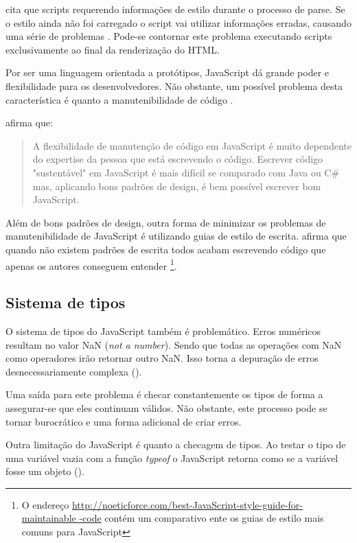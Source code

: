 \citet{howBrowsersWork} cita que scripts requerendo informações de
estilo durante o processo de parse. Se o estilo ainda não foi carregado
o script vai utilizar informações erradas, causando uma série de
problemas . Pode-se
contornar este problema executando scripts exclusivamente ao final da
renderização do HTML.

Por ser uma linguagem orientada a protótipos, JavaScript dá grande
poder e flexibilidade para os desenvolvedores. Não obstante, um
possível problema desta característica é quanto a manutenibilidade de
código .

\citet{html5Tradeoffs} afirma que:
\begin{quote}
A flexibilidade de manutenção de código em JavaScript é muito
dependente do expertise da pessoa que está escrevendo o código.
Escrever código "sustentável" em JavaScript é mais difícil se
comparado com Java ou C\# mas, aplicando bons padrões de design, é bem
possível escrever bom JavaScript.
\end{quote}

Além de bons padrões de design, outra forma de minimizar os
problemas de manutenibilidade de JavaScript é utilizando guias
de estilo de escrita. \citet{jsStyleGuide} afirma que quando
não existem padrões de escrita todos acabam escrevendo código
que apenas os autores conseguem entender \footnote{O endereço
\url{http://noeticforce.com/best-JavaScript-style-guide-for-maintainable
-code} contém um comparativo ente os guias de estilo mais comuns para
JavaScript}.

\subsection{Sistema de tipos}

O sistema de tipos do JavaScript também é problemático.
Erros numéricos resultam no valor NaN (\textit{not a number}).
Sendo que todas as operações com NaN como operadores irão retornar outro
NaN. Isso torna a depuração de erros desnecessariamente complexa
\autocite{html5mostwanted} ().

Uma saída para este problema é checar constantemente os tipos de forma
a assegurar-se que eles continuam válidos. Não obstante, este processo
pode se tornar burocrático e uma forma adicional de criar erros.

Outra limitação do JavaScript é quanto a checagem de tipos. Ao
testar o tipo de uma variável vazia com a função \textit{typeof} o
JavaScript retorna como se a variável fosse um objeto ().

